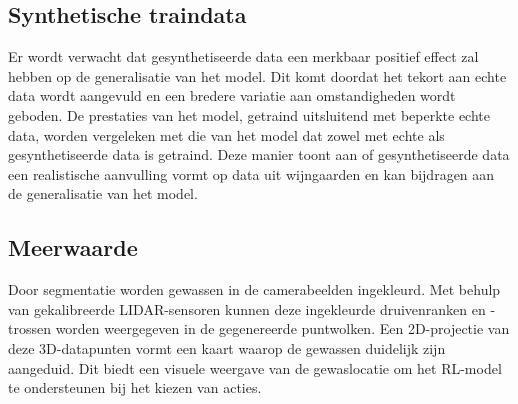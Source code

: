 \subsection{Synthetische traindata}
Er wordt verwacht dat gesynthetiseerde data een merkbaar positief effect zal hebben op de generalisatie van het model. Dit komt doordat het tekort aan echte data wordt aangevuld en een bredere variatie aan omstandigheden wordt geboden. De prestaties van het model, getraind uitsluitend met beperkte echte data, worden vergeleken met die van het model dat zowel met echte als gesynthetiseerde data is getraind. Deze manier toont aan of gesynthetiseerde data een realistische aanvulling vormt op data uit wijngaarden en kan bijdragen aan de generalisatie van het model.

\subsection{Meerwaarde}
Door segmentatie worden gewassen in de camerabeelden ingekleurd. Met behulp van gekalibreerde LIDAR-sensoren kunnen deze ingekleurde druivenranken en -trossen worden weergegeven in de gegenereerde puntwolken. Een 2D-projectie van deze 3D-datapunten vormt een kaart waarop de gewassen duidelijk zijn aangeduid. Dit biedt een visuele weergave van de gewaslocatie om het RL-model te ondersteunen bij het kiezen van acties.